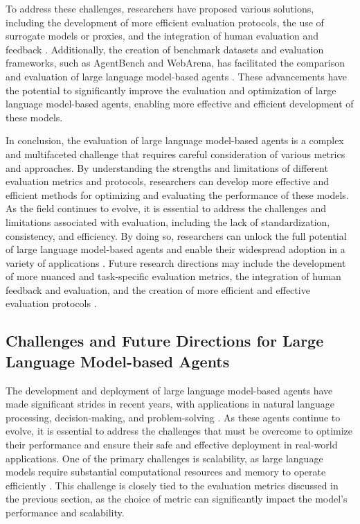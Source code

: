 \documentclass[11pt,a4paper]{article}
\begin{document}
To address these challenges, researchers have proposed various solutions, including the development of more efficient evaluation protocols, the use of surrogate models or proxies, and the integration of human evaluation and feedback \cite{arxiv:2410.06153}. Additionally, the creation of benchmark datasets and evaluation frameworks, such as AgentBench and WebArena, has facilitated the comparison and evaluation of large language model-based agents \cite{arxiv:2308.03688}. These advancements have the potential to significantly improve the evaluation and optimization of large language model-based agents, enabling more effective and efficient development of these models.

In conclusion, the evaluation of large language model-based agents is a complex and multifaceted challenge that requires careful consideration of various metrics and approaches. By understanding the strengths and limitations of different evaluation metrics and protocols, researchers can develop more effective and efficient methods for optimizing and evaluating the performance of these models. As the field continues to evolve, it is essential to address the challenges and limitations associated with evaluation, including the lack of standardization, consistency, and efficiency. By doing so, researchers can unlock the full potential of large language model-based agents and enable their widespread adoption in a variety of applications \cite{arxiv:2303.18223}. Future research directions may include the development of more nuanced and task-specific evaluation metrics, the integration of human feedback and evaluation, and the creation of more efficient and effective evaluation protocols \cite{arxiv:2309.03409}.


\subsection{Challenges and Future Directions for Large Language Model-based Agents}


The development and deployment of large language model-based agents have made significant strides in recent years, with applications in natural language processing, decision-making, and problem-solving \cite{arxiv:2402.06196}. As these agents continue to evolve, it is essential to address the challenges that must be overcome to optimize their performance and ensure their safe and effective deployment in real-world applications. One of the primary challenges is scalability, as large language models require substantial computational resources and memory to operate efficiently \cite{arxiv:2312.00678}. This challenge is closely tied to the evaluation metrics discussed in the previous section, as the choice of metric can significantly impact the model's performance and scalability.
\end{document}
